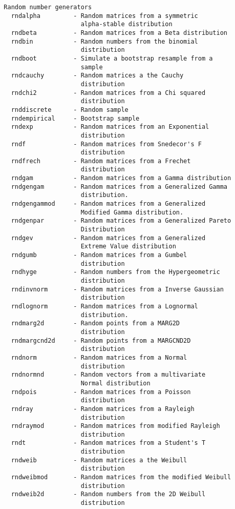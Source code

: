 {\begin{verbatim}
  Random number generators
    rndalpha         - Random matrices from a symmetric
                       alpha-stable distribution
    rndbeta          - Random matrices from a Beta distribution
    rndbin           - Random numbers from the binomial
                       distribution
    rndboot          - Simulate a bootstrap resample from a
                       sample
    rndcauchy        - Random matrices a the Cauchy
                       distribution
    rndchi2          - Random matrices from a Chi squared
                       distribution
    rnddiscrete      - Random sample
    rndempirical     - Bootstrap sample
    rndexp           - Random matrices from an Exponential
                       distribution
    rndf             - Random matrices from Snedecor's F
                       distribution
    rndfrech         - Random matrices from a Frechet
                       distribution
    rndgam           - Random matrices from a Gamma distribution
    rndgengam        - Random matrices from a Generalized Gamma
                       distribution.
    rndgengammod     - Random matrices from a Generalized
                       Modified Gamma distribution.
    rndgenpar        - Random matrices from a Generalized Pareto
                       Distribution
    rndgev           - Random matrices from a Generalized
                       Extreme Value distribution
    rndgumb          - Random matrices from a Gumbel
                       distribution
    rndhyge          - Random numbers from the Hypergeometric
                       distribution
    rndinvnorm       - Random matrices from a Inverse Gaussian
                       distribution
    rndlognorm       - Random matrices from a Lognormal
                       distribution.
    rndmarg2d        - Random points from a MARG2D
                       distribution
    rndmargcnd2d     - Random points from a MARGCND2D
                       distribution
    rndnorm          - Random matrices from a Normal
                       distribution
    rndnormnd        - Random vectors from a multivariate
                       Normal distribution
    rndpois          - Random matrices from a Poisson
                       distribution
    rndray           - Random matrices from a Rayleigh
                       distribution
    rndraymod        - Random matrices from modified Rayleigh
                       distribution
    rndt             - Random matrices from a Student's T
                       distribution
    rndweib          - Random matrices a the Weibull
                       distribution
    rndweibmod       - Random matrices from the modified Weibull
                       distribution
    rndweib2d        - Random numbers from the 2D Weibull
                       distribution


\end{verbatim}}
